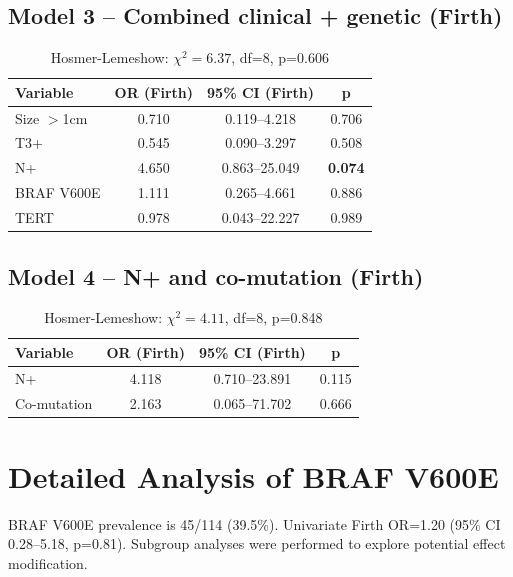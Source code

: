 \documentclass[12pt,a4paper]{article}
\begin{document}
\subsection{Model 3 -- Combined clinical + genetic (Firth)}
\begin{table}[H]
\centering
\caption{Multivariate Firth analysis -- Combined model (N=114, events=7)}
\label{tab:multi3}
\begin{tabular}{lccc}
\toprule
Variable & OR (Firth) & 95\% CI (Firth) & p \\
\midrule
Size $>$1cm     & 0.710 & 0.119--4.218  & 0.706 \\
T3+         & 0.545 & 0.090--3.297  & 0.508 \\
N+          & 4.650 & 0.863--25.049 & \textbf{0.074} \\
BRAF V600E  & 1.111 & 0.265--4.661  & 0.886 \\
TERT        & 0.978 & 0.043--22.227 & 0.989 \\
\bottomrule
\end{tabular}
\caption*{Hosmer-Lemeshow: $\chi^2=6.37$, df=8, p=0.606}
\end{table}

\subsection{Model 4 -- N+ and co-mutation (Firth)}
\begin{table}[H]
\centering
\caption{Multivariate Firth analysis -- N+ and co-mutation (N=114, events=7)}
\label{tab:multi4}
\begin{tabular}{lccc}
\toprule
Variable & OR (Firth) & 95\% CI (Firth) & p \\
\midrule
N+             & 4.118 & 0.710--23.891 & 0.115 \\
Co-mutation & 2.163 & 0.065--71.702 & 0.666 \\
\bottomrule
\end{tabular}
\caption*{Hosmer-Lemeshow: $\chi^2=4.11$, df=8, p=0.848}
\end{table}

\section{Detailed Analysis of BRAF V600E}
BRAF V600E prevalence is 45/114 (39.5\%). Univariate Firth OR=1.20 (95\% CI 0.28--5.18, p=0.81). Subgroup analyses were performed to explore potential effect modification.
\end{document}
